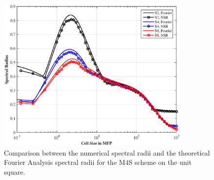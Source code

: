 \begin{figure}
\centering
\includegraphics[width=0.85\textwidth]{figures/appendices/SI_M4S_2D_wNSR.eps}
\caption{Comparison between the numerical spectral radii and the theoretical Fourier Analysis spectral radii for the M4S scheme on the unit square.}
\label{fig::App_DSA_2D_M4S_Fourier_NSR}
\end{figure}

